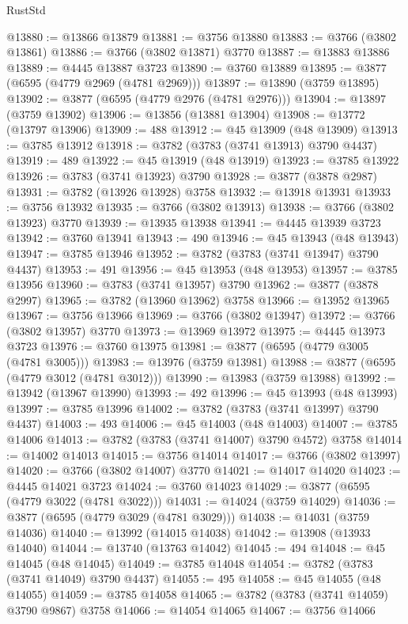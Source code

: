 \begin{lexlean}{RustStd}
\begin{coremodule}
@13880 := @13866 @13879
@13881 := @3756 @13880
@13883 := @3766 (@3802 @13861)
@13886 := @3766 (@3802 @13871) @3770
@13887 := @13883 @13886
@13889 := @4445 @13887 @3723
@13890 := @3760 @13889
@13895 := @3877 (@6595 (@4779 @2969 (@4781 @2969)))
@13897 := @13890 (@3759 @13895)
@13902 := @3877 (@6595 (@4779 @2976 (@4781 @2976)))
@13904 := @13897 (@3759 @13902)
@13906 := @13856 (@13881 @13904)
@13908 := @13772 (@13797 @13906)
@13909 := 488
@13912 := @45 @13909 (@48 @13909)
@13913 := @3785 @13912
@13918 := @3782 (@3783 (@3741 @13913) @3790 @4437)
@13919 := 489
@13922 := @45 @13919 (@48 @13919)
@13923 := @3785 @13922
@13926 := @3783 (@3741 @13923) @3790
@13928 := @3877 (@3878 @2987)
@13931 := @3782 (@13926 @13928) @3758
@13932 := @13918 @13931
@13933 := @3756 @13932
@13935 := @3766 (@3802 @13913)
@13938 := @3766 (@3802 @13923) @3770
@13939 := @13935 @13938
@13941 := @4445 @13939 @3723
@13942 := @3760 @13941
@13943 := 490
@13946 := @45 @13943 (@48 @13943)
@13947 := @3785 @13946
@13952 := @3782 (@3783 (@3741 @13947) @3790 @4437)
@13953 := 491
@13956 := @45 @13953 (@48 @13953)
@13957 := @3785 @13956
@13960 := @3783 (@3741 @13957) @3790
@13962 := @3877 (@3878 @2997)
@13965 := @3782 (@13960 @13962) @3758
@13966 := @13952 @13965
@13967 := @3756 @13966
@13969 := @3766 (@3802 @13947)
@13972 := @3766 (@3802 @13957) @3770
@13973 := @13969 @13972
@13975 := @4445 @13973 @3723
@13976 := @3760 @13975
@13981 := @3877 (@6595 (@4779 @3005 (@4781 @3005)))
@13983 := @13976 (@3759 @13981)
@13988 := @3877 (@6595 (@4779 @3012 (@4781 @3012)))
@13990 := @13983 (@3759 @13988)
@13992 := @13942 (@13967 @13990)
@13993 := 492
@13996 := @45 @13993 (@48 @13993)
@13997 := @3785 @13996
@14002 := @3782 (@3783 (@3741 @13997) @3790 @4437)
@14003 := 493
@14006 := @45 @14003 (@48 @14003)
@14007 := @3785 @14006
@14013 := @3782 (@3783 (@3741 @14007) @3790 @4572) @3758
@14014 := @14002 @14013
@14015 := @3756 @14014
@14017 := @3766 (@3802 @13997)
@14020 := @3766 (@3802 @14007) @3770
@14021 := @14017 @14020
@14023 := @4445 @14021 @3723
@14024 := @3760 @14023
@14029 := @3877 (@6595 (@4779 @3022 (@4781 @3022)))
@14031 := @14024 (@3759 @14029)
@14036 := @3877 (@6595 (@4779 @3029 (@4781 @3029)))
@14038 := @14031 (@3759 @14036)
@14040 := @13992 (@14015 @14038)
@14042 := @13908 (@13933 @14040)
@14044 := @13740 (@13763 @14042)
@14045 := 494
@14048 := @45 @14045 (@48 @14045)
@14049 := @3785 @14048
@14054 := @3782 (@3783 (@3741 @14049) @3790 @4437)
@14055 := 495
@14058 := @45 @14055 (@48 @14055)
@14059 := @3785 @14058
@14065 := @3782 (@3783 (@3741 @14059) @3790 @9867) @3758
@14066 := @14054 @14065
@14067 := @3756 @14066

\end{coremodule}
\end{lexlean}
